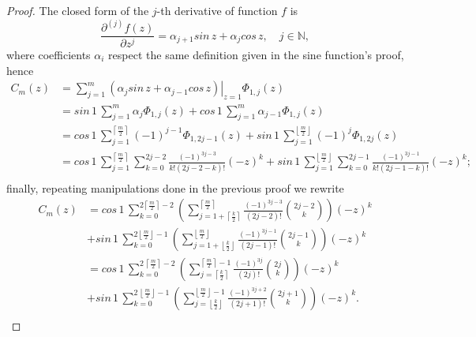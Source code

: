 \begin{proof}
The closed form of the $j$-th derivative of function $f$ is
$$\frac{\partial^{(j)}{f}(z)}{\partial{z}^{j}} = \alpha_{j+1}sin\,{z} +
\alpha_{j}cos\,{z}, \quad j\in\mathbb{N},$$ where coefficients $\alpha_{i}$
respect the same definition given in the sine function's proof, hence 
\begin{displaymath}
\begin{split}
  C_{m}(z) &= \sum_{j=1}^{m}{ \left. \left(\alpha_{j}sin\,{z} + \alpha_{j-1}cos\,{z}\right) \right|_{z=1}\Phi_{1,j}(z)} \\
       &= sin\,{1}\,\sum_{j=1}^{m}{ \alpha_{j}\Phi_{1,j}(z)} + cos\,{1}\,\sum_{j=1}^{m}{ \alpha_{j-1}\Phi_{1,j}(z)} \\
       &= cos\,{1}\,\sum_{j=1}^{\left\lceil \frac{m}{2} \right\rceil}{ (-1)^{j-1}\Phi_{1,2j-1}(z)} 
        + sin\,{1}\,\sum_{j=1}^{\left\lfloor \frac{m}{2} \right\rfloor}{ (-1)^{j}\Phi_{1,2j}(z)} \\
       &= cos\,{1}\,\sum_{j=1}^{\left\lceil \frac{m}{2} \right\rceil}{\sum_{k=0}^{2j-2}{ \frac{(-1)^{3j-3}}{k!(2j-2-k)!}{(-z)^{k}}} }
        + sin\,{1}\,\sum_{j=1}^{\left\lfloor \frac{m}{2} \right\rfloor}{\sum_{k=0}^{2j-1}{ \frac{(-1)^{3j-1}}{k!(2j-1-k)!}{(-z)^{k}}}}; \\
\end{split}
\end{displaymath}
finally, repeating manipulations done in the previous proof we rewrite
\begin{displaymath}
\begin{split}
  C_{m}(z)  &= cos\,{1}\,\sum_{k=0}^{2 \left\lceil \frac{m}{2} \right\rceil-2}{\left(\sum_{j=1+\left\lceil \frac{k}{2}\right\rceil}^{\left\lceil \frac{m}{2} \right\rceil}{\frac{(-1)^{3j-3}}{(2j-2)!}{2j-2\choose k}}\right) {(-z)^{k}}}\\
            &+ sin\,{1}\,\sum_{k=0}^{2 \left\lfloor \frac{m}{2} \right\rfloor-1}{\left(\sum_{j=1+\left\lfloor \frac{k}{2}\right\rfloor}^{\left\lfloor \frac{m}{2} \right\rfloor}{ \frac{(-1)^{3j-1}}{(2j-1)!} {2j-1\choose k}}\right){(-z)^{k}}} \\
            &= cos\,{1}\,\sum_{k=0}^{2\,\left\lceil \frac{m}{2} \right\rceil-2}{\left(\sum_{j=\left\lceil \frac{k}{2}\right\rceil}^{\left\lceil \frac{m}{2} \right\rceil -1}{\frac{(-1)^{3j}}{(2j)!}{2j\choose k}}\right) {(-z)^{k}}}\\
            &+ sin\,{1}\,\sum_{k=0}^{2\,\left\lfloor \frac{m}{2} \right\rfloor-1}{\left(\sum_{j=\left\lfloor \frac{k}{2}\right\rfloor}^{\left\lfloor \frac{m}{2} \right\rfloor -1}{\frac{(-1)^{3j+2}}{(2j + 1)!} {2j+1\choose k}}\right){(-z)^{k}}}. \\
\end{split}
\end{displaymath}
\end{proof}

